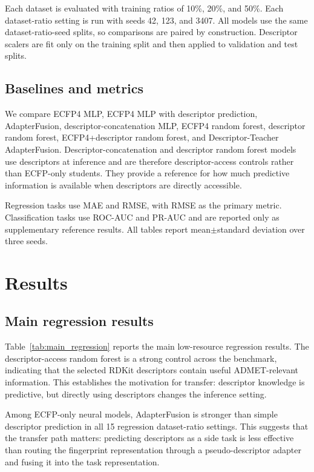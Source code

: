 \documentclass[11pt]{article}
\begin{document}
Each dataset is evaluated with training ratios of 10\%, 20\%, and 50\%. Each
dataset-ratio setting is run with seeds 42, 123, and 3407. All models use the
same dataset-ratio-seed splits, so comparisons are paired by construction.
Descriptor scalers are fit only on the training split and then applied to
validation and test splits.

\subsection{Baselines and metrics}

We compare ECFP4 MLP, ECFP4 MLP with descriptor prediction, AdapterFusion,
descriptor-concatenation MLP, ECFP4 random forest, descriptor random forest,
ECFP4+descriptor random forest, and Descriptor-Teacher AdapterFusion.
Descriptor-concatenation and descriptor random forest models use descriptors at
inference and are therefore descriptor-access controls rather than ECFP-only
students. They provide a reference for how much predictive information is
available when descriptors are directly accessible.

Regression tasks use MAE and RMSE, with RMSE as the primary metric.
Classification tasks use ROC-AUC and PR-AUC and are reported only as
supplementary reference results. All tables report mean$\pm$standard deviation
over three seeds.

\section{Results}

\subsection{Main regression results}



Table~\ref{tab:main_regression} reports the main low-resource regression
results.
The descriptor-access random forest is a strong control across the benchmark,
indicating that the selected RDKit descriptors contain useful ADMET-relevant
information. This establishes the motivation for transfer: descriptor
knowledge is predictive, but directly using descriptors changes the inference
setting.

Among ECFP-only neural models, AdapterFusion is stronger than simple
descriptor prediction in all 15 regression dataset-ratio settings. This
suggests that the transfer path matters: predicting descriptors as a side task
is less effective than routing the fingerprint representation through a
pseudo-descriptor adapter and fusing it into the task representation.
\end{document}
